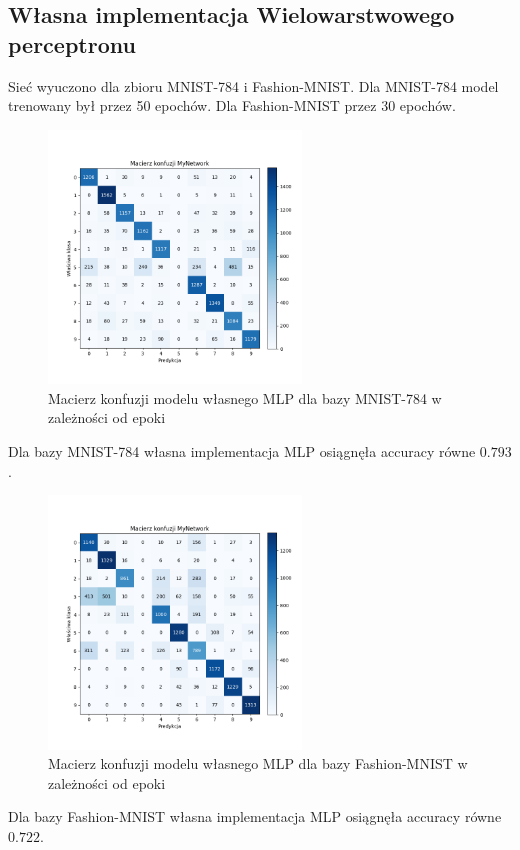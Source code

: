 \documentclass{article}
\begin{document}
\subsection{Własna implementacja Wielowarstwowego perceptronu}
Sieć wyuczono dla zbioru MNIST-784 i Fashion-MNIST. Dla MNIST-784 model trenowany był przez 50 epochów. Dla Fashion-MNIST przez 30 epochów.

\begin{figure}[H]
    \centering
    \includegraphics[width=0.6\textwidth]{../Saves/MyNetwork/mnist-784/MyNetwork_mnist_784_conf_mat.png}
    \caption{Macierz konfuzji modelu własnego MLP dla bazy MNIST-784 w zależności od epoki}
\end{figure}
Dla bazy MNIST-784 własna implementacja MLP osiągnęła accuracy równe $0.793$.

\begin{figure}[H]
    \centering
    \includegraphics[width=0.6\textwidth]{../Saves/MyNetwork/fashion-mnist/MyNetwork_fashion-mnist_conf_mat.png}
    \caption{Macierz konfuzji modelu własnego MLP dla bazy Fashion-MNIST w zależności od epoki}
\end{figure}
Dla bazy Fashion-MNIST własna implementacja MLP osiągnęła accuracy równe $0.722$.
\end{document}
